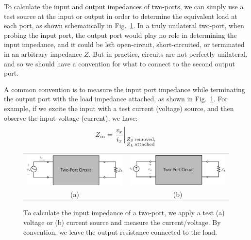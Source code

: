 To calculate the input and output impedances of two-ports, we can simply use a test source at the input or output  in order to determine the equivalent load at each port, as shown schematically in Fig.~\ref{fig:2port_zin_vx}.  In a truly unilateral two-port, when probing the input port, the output port would play no role in determining the input impedance, and it could be left open-circuit, short-circuited, or terminated in an arbitrary impedance $Z$.  But in practice, circuits are not perfectly unilateral, and so we should have a convention for what to connect to the second output port.

A common convention is to measure the input port impedance while terminating the output port with the load impedance attached, as shown in Fig.~\ref{fig:2port_zin_vx}.  For example, if we excite the input with a test current (voltage) source, and then observe the input voltage (current), we have:
%
\begin{equation}
	Z_{in} = \left. \frac{v_x}
                        {i_x} 
                                         \right|_{\scriptstyle{Z_S}\,\text{removed},\hfill\atop
	\scriptstyle{Z_L}\,\text{attached}\hfill}
\end{equation}


\begin{figure}[tb]
\begin{center}
\begin{tabular}{cc}
\includegraphics[width=.5\columnwidth]{2port_zin_vx} &
\includegraphics[width=.5\columnwidth]{2port_zin_ix} \\
(a) & (b) \\
\end{tabular}
\end{center}
\caption{To calculate the input impedance of a two-port, we apply a test (a) voltage or (b) current source and measure the current/voltage.  By convention, we leave the output resistance connected to the load.} \label{fig:2port_zin_vx}
\end{figure}



